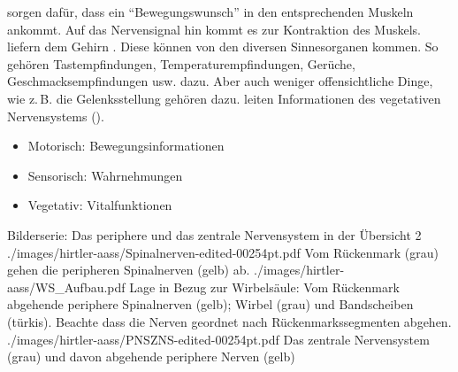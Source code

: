 {%
 sorgen dafür, dass ein
\protect\enquote{Bewegungswunsch} in den entsprechenden
Muskeln ankommt. Auf das Nervensignal hin kommt es zur
Kontraktion des Muskels.
%
 liefern dem Gehirn
. Diese können von den diversen
Sinnesorganen kommen. So gehören Tastempfindungen,
Temperaturempfindungen, Gerüche, Geschmacksempfindungen usw.
dazu. Aber auch weniger offensichtliche Dinge, wie z.\,B.
die Gelenksstellung gehören dazu.
%
 leiten Informationen des vegetativen Nervensystems 
(). 
}
{
\begin{itemize}
    \item Motorisch: Bewegungsinformationen  
    \item Sensorisch: Wahrnehmungen 
    \item Vegetativ: Vitalfunktionen 
\end{itemize}
}{}{}{}



\begin{PictureSeries}{Bilderserie: Das periphere und das zentrale Nervensystem in der Übersicht}{}
\PictureSeriesRowWide
{2}%
{./images/hirtler-aass/Spinalnerven-edited-00254pt.pdf}%
{Vom Rückenmark (grau) gehen die peripheren Spinalnerven (gelb) ab. 
}%
{./images/hirtler-aass/WS_Aufbau.pdf}%
{Lage in Bezug zur Wirbelsäule: 
Vom Rückenmark abgehende periphere Spinalnerven (gelb); Wirbel (grau) und Bandscheiben (türkis).
Beachte dass die Nerven geordnet 
nach Rückenmarkssegmenten abgehen.
}%
{./images/hirtler-aass/PNSZNS-edited-00254pt.pdf}%
{Das zentrale Nervensystem (grau) und davon abgehende periphere Nerven (gelb) 
}%
{}%
{}%
\end{PictureSeries}

